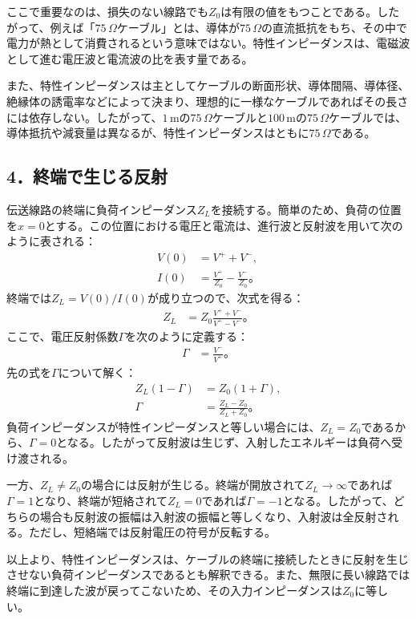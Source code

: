 \documentclass[platex,dvipdfmx,a4paper]{jsarticle}
\begin{document}
ここで重要なのは、損失のない線路でも$Z_0$は有限の値をもつことである。したがって、例えば「$75\,\Omega$ケーブル」とは、導体が$75\,\Omega$の直流抵抗をもち、その中で電力が熱として消費されるという意味ではない。特性インピーダンスは、電磁波として進む電圧波と電流波の比を表す量である。

また、特性インピーダンスは主としてケーブルの断面形状、導体間隔、導体径、絶縁体の誘電率などによって決まり、理想的に一様なケーブルであればその長さには依存しない。したがって、$1\,\mathrm{m}$の$75\,\Omega$ケーブルと$100\,\mathrm{m}$の$75\,\Omega$ケーブルでは、導体抵抗や減衰量は異なるが、特性インピーダンスはともに$75\,\Omega$である。

\subsection*{4．終端で生じる反射}

伝送線路の終端に負荷インピーダンス$Z_L$を接続する。簡単のため、負荷の位置を$x=0$とする。この位置における電圧と電流は、進行波と反射波を用いて次のように表される：
\begin{align*}
  V(0)
  &=V^++V^-, \\
  I(0)
  &=\frac{V^+}{Z_0}-\frac{V^-}{Z_0}。
\end{align*}
終端では$Z_L=V(0)/I(0)$が成り立つので、次式を得る：
\begin{align*}
  Z_L
  &=Z_0\frac{V^++V^-}{V^+-V^-}。
\end{align*}
ここで、電圧反射係数$\Gamma$を次のように定義する：
\begin{align*}
  \Gamma
  &=\frac{V^-}{V^+}。
\end{align*}
先の式を$\Gamma$について解く：
\begin{align*}
  Z_L(1-\Gamma)
  &=Z_0(1+\Gamma), \\
  \Gamma
  &=\frac{Z_L-Z_0}{Z_L+Z_0}。
\end{align*}
負荷インピーダンスが特性インピーダンスと等しい場合には、$Z_L=Z_0$であるから、$\Gamma=0$となる。したがって反射波は生じず、入射したエネルギーは負荷へ受け渡される。

一方、$Z_L\neq Z_0$の場合には反射が生じる。終端が開放されて$Z_L\to\infty$であれば$\Gamma=1$となり、終端が短絡されて$Z_L=0$であれば$\Gamma=-1$となる。したがって、どちらの場合も反射波の振幅は入射波の振幅と等しくなり、入射波は全反射される。ただし、短絡端では反射電圧の符号が反転する。

以上より、特性インピーダンスは、ケーブルの終端に接続したときに反射を生じさせない負荷インピーダンスであるとも解釈できる。また、無限に長い線路では終端に到達した波が戻ってこないため、その入力インピーダンスは$Z_0$に等しい。
\end{document}

